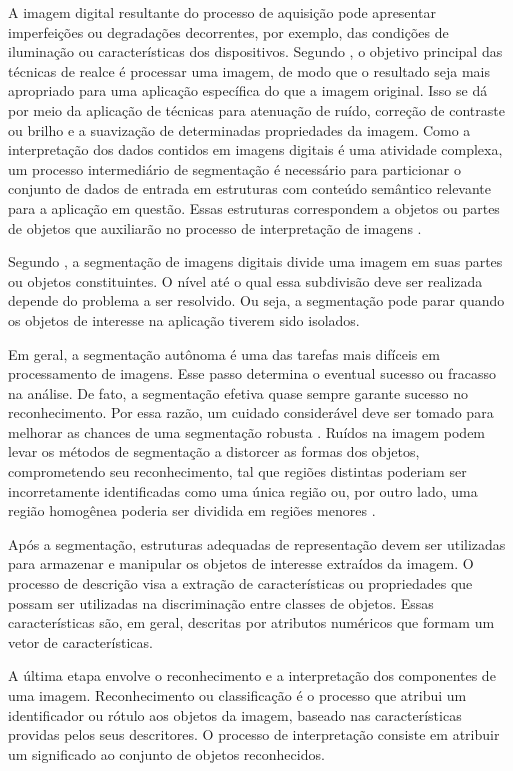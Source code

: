 \documentclass[12pt,oneside,a4paper,english,french,spanish,brazil,]{abntex2}
\begin{document}
A imagem digital resultante do processo de aquisição pode apresentar imperfeições ou degradações decorrentes, por exemplo, das condições de iluminação ou características dos dispositivos. Segundo \citet{gonzalez:2012}, o objetivo principal das técnicas de realce é processar uma imagem, de modo que o resultado seja mais apropriado para uma aplicação específica do que a imagem original. Isso se dá por meio da aplicação de técnicas para atenuação de ruído, correção de contraste ou brilho e a suavização de determinadas propriedades da imagem.
Como a interpretação dos dados contidos em imagens digitais é uma atividade complexa, um processo intermediário de segmentação é necessário para particionar o conjunto de dados de entrada em estruturas com conteúdo semântico relevante para a aplicação em questão. Essas estruturas correspondem a objetos ou partes de objetos que auxiliarão no processo de interpretação de imagens \cite{pedrini:2008}.

Segundo \citet{gonzalez:2012}, a segmentação de imagens digitais divide uma imagem em suas partes ou objetos constituintes. O nível até o qual essa subdivisão deve ser realizada depende do problema a ser resolvido. Ou seja, a segmentação pode parar quando os objetos de interesse na aplicação tiverem sido isolados.

Em geral, a segmentação autônoma é uma das tarefas mais difíceis em processamento de imagens. Esse passo determina o eventual sucesso ou fracasso na análise. De fato, a segmentação efetiva quase sempre garante sucesso no reconhecimento. Por essa razão, um cuidado considerável deve ser tomado para melhorar as chances de uma segmentação robusta \cite{gonzalez:2012}. Ruídos na imagem podem levar os métodos de segmentação a distorcer as formas dos objetos, comprometendo seu reconhecimento, tal que regiões distintas poderiam ser incorretamente identificadas como uma única região ou, por outro lado, uma região homogênea poderia ser dividida em regiões menores \cite{pedrini:2008}.

Após a segmentação, estruturas adequadas de representação devem ser utilizadas para armazenar e manipular os objetos de interesse extraídos da imagem. O processo de descrição visa a extração de características ou propriedades que possam ser utilizadas na discriminação entre classes de objetos. Essas características são, em geral, descritas por atributos numéricos que formam um vetor de características.

A última etapa envolve o reconhecimento e a interpretação dos componentes de uma imagem. Reconhecimento ou classificação é o processo que atribui um identificador ou rótulo aos objetos da imagem, baseado nas características providas pelos seus descritores. O processo de interpretação consiste em atribuir um significado ao conjunto de objetos reconhecidos.
\end{document}

